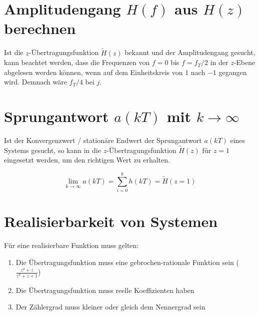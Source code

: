 \documentclass[10pt,a5paper]{scrartcl}
\begin{document}
\section{Amplitudengang $H(f)$ aus $H(z)$ berechnen}

Ist die \(z\)-Übertragungsfunktion \(\tilde{H}(z)\) bekannt und der Amplitudengang gesucht, kann beachtet werden, dass die Frequenzen von \(f = 0\) bis \(f = f_T/2\) in der \(z\)-Ebene abgelesen werden können, wenn auf dem Einheitskreis von \(1\) nach \(-1\) gegangen wird. Demnach wäre \(f_T/4\) bei \(j\).

\section{Sprungantwort $a(kT)$ mit $k \rightarrow \infty$}

Ist der Konvergenzwert / stationäre Endwert der Sprungantwort \(a(kT)\) eines Systems gesucht, so kann in die \(z\)-Übertragungsfunktion \(\tilde{H}(z)\) für \(z = 1\) eingesetzt werden, um den richtigen Wert zu erhalten.

\[\lim_{k \rightarrow \infty}a(kT) = \sum_{i=0}^k h(kT) = \tilde{H}(z = 1)\]

\section{Realisierbarkeit von Systemen}

Für eine realisierbare Funktion muss gelten:

\begin{enumerate}
\item Die Übertragungsfunktion muss eine gebrochen-rationale Funktion sein (\(\frac{z^2+z}{z^3+z+1}\))
\item Die Übertragungsfunktion muss reelle Koeffizienten haben
\item Der Zählergrad muss kleiner oder gleich dem Nennergrad sein
\end{enumerate}
\end{document}
